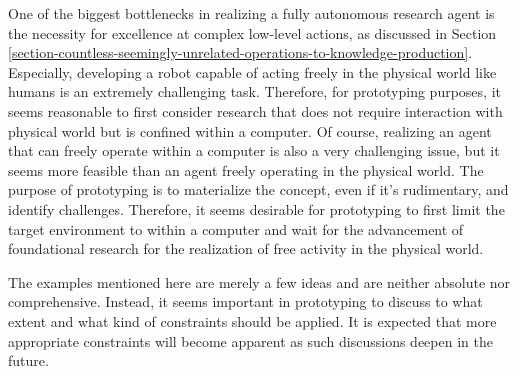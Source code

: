 One of the biggest bottlenecks in realizing a fully autonomous research agent is the necessity for excellence at complex low-level actions, as discussed in Section \ref{section-countless-seemingly-unrelated-operations-to-knowledge-production}. Especially, developing a robot capable of acting freely in the physical world like humans is an extremely challenging task. Therefore, for prototyping purposes, it seems reasonable to first consider research that does not require interaction with physical world but is confined within a computer. Of course, realizing an agent that can freely operate within a computer is also a very challenging issue, but it seems more feasible than an agent freely operating in the physical world. The purpose of prototyping is to materialize the concept, even if it's rudimentary, and identify challenges. Therefore, it seems desirable for prototyping to first limit the target environment to within a computer and wait for the advancement of foundational research for the realization of free activity in the physical world.

The examples mentioned here are merely a few ideas and are neither absolute nor comprehensive. Instead, it seems important in prototyping to discuss to what extent and what kind of constraints should be applied. It is expected that more appropriate constraints will become apparent as such discussions deepen in the future.



